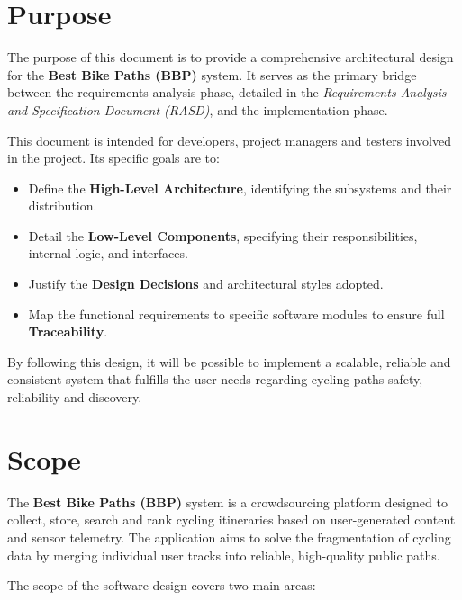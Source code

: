 \section{Purpose}
The purpose of this document is to provide a comprehensive architectural design for the \textbf{Best Bike Paths (BBP)} system. It serves as the primary bridge between the requirements analysis phase, detailed in the \textit{Requirements Analysis and Specification Document (RASD)}, and the implementation phase.

This document is intended for developers, project managers and testers involved in the project. Its specific goals are to:
\begin{itemize}
    \item Define the \textbf{High-Level Architecture}, identifying the subsystems and their distribution.
    \item Detail the \textbf{Low-Level Components}, specifying their responsibilities, internal logic, and interfaces.
    \item Justify the \textbf{Design Decisions} and architectural styles adopted.
    \item Map the functional requirements to specific software modules to ensure full \textbf{Traceability}.
\end{itemize}

By following this design, it will be possible to implement a scalable, reliable and consistent system that fulfills the user needs regarding cycling paths safety, reliability and discovery.

\section{Scope}
The \textbf{Best Bike Paths (BBP)} system is a crowdsourcing platform designed to collect, store, search and rank cycling itineraries based on user-generated content and sensor telemetry. The application aims to solve the fragmentation of cycling data by merging individual user tracks into reliable, high-quality public paths.

The scope of the software design covers two main areas:


